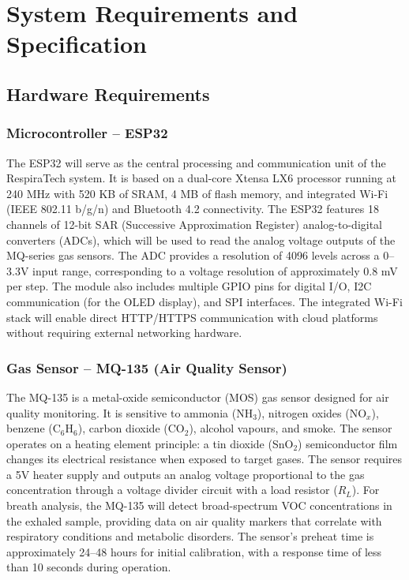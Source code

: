 \chapter{System Requirements and Specification}

\section{Hardware Requirements}

\subsection{Microcontroller -- ESP32}
The ESP32 will serve as the central processing and communication unit of the RespiraTech system. It is based on a dual-core Xtensa LX6 processor running at 240 MHz with 520 KB of SRAM, 4 MB of flash memory, and integrated Wi-Fi (IEEE 802.11 b/g/n) and Bluetooth 4.2 connectivity. The ESP32 features 18 channels of 12-bit SAR (Successive Approximation Register) analog-to-digital converters (ADCs), which will be used to read the analog voltage outputs of the MQ-series gas sensors. The ADC provides a resolution of 4096 levels across a 0--3.3V input range, corresponding to a voltage resolution of approximately 0.8 mV per step. The module also includes multiple GPIO pins for digital I/O, I2C communication (for the OLED display), and SPI interfaces. The integrated Wi-Fi stack will enable direct HTTP/HTTPS communication with cloud platforms without requiring external networking hardware.

\subsection{Gas Sensor -- MQ-135 (Air Quality Sensor)}
The MQ-135 is a metal-oxide semiconductor (MOS) gas sensor designed for air quality monitoring. It is sensitive to ammonia (NH$_3$), nitrogen oxides (NO$_x$), benzene (C$_6$H$_6$), carbon dioxide (CO$_2$), alcohol vapours, and smoke. The sensor operates on a heating element principle: a tin dioxide (SnO$_2$) semiconductor film changes its electrical resistance when exposed to target gases. The sensor requires a 5V heater supply and outputs an analog voltage proportional to the gas concentration through a voltage divider circuit with a load resistor ($R_L$). For breath analysis, the MQ-135 will detect broad-spectrum VOC concentrations in the exhaled sample, providing data on air quality markers that correlate with respiratory conditions and metabolic disorders. The sensor's preheat time is approximately 24--48 hours for initial calibration, with a response time of less than 10 seconds during operation.

